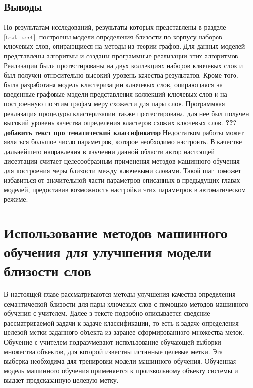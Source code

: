 \subsection{Выводы}
По результатам исследований, результаты которых представлены в разделе \ref{test_sect}, построены модели определения близости по корпусу наборов ключевых слов, опирающиеся на методы из теории графов. Для данных моделей представлены алгоритмы и созданы программные реализации этих алгоритмов. Реализации были протестированы на двух коллекциях наборов ключевых слов и был получен относительно высокий уровень качества результатов. Кроме того, была разработана модель кластеризации ключевых слов, опирающаяся на введенные графовые модели представления коллекций ключевых слов и на построенную по этим графам меру схожести для пары слов. Программная реализация процедуры кластеризации также протестирована, для нее был получен высокий уровень качества определения кластеров схожих ключевых слов.
\textbf{??? добавить текст про тематический классификатор}
Недостатком работы может являться большое число параметров, которое необходимо настроить. В качестве дальнейшего направления в изучении данной области автор настоящей дисертации считает целесообразным применения методов машинного обучения для построения меры близости между ключевыми словами. Такой шаг поможет избавиться от значительной части параметров описанных в предыдущих главах моделей, предоставив возможность настройки этих параметров в автоматическом режиме.

\section{Использование методов машинного обучения для улучшения модели близости слов}
В настоящей главе рассматриваются методы улучшения качества определения семантической близости для пары ключевых слов с помощью методов машинного обучения с учителем. Далее в тексте подробно описывается сведение рассматриваемой задачи к задаче классификации, то есть к задаче определения целевой метки заданного объекта из заранее сформированного множества меток. Обучение с учителем подразумевают использование обучающей выборки - множества объектов, для которой известны истинные целевые метки. Эта выборка необходима для тренировки модели машинного обучения. Обученная модель машинного обучения применяется к произвольному объекту системы и выдает предсказанную целевую метку.

